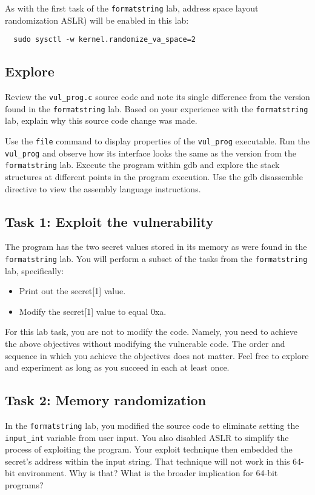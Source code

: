 As with the first task of the {\tt formatstring} lab, address space layout randomization ASLR) will be
enabled in this lab:
\begin{verbatim}
  sudo sysctl -w kernel.randomize_va_space=2
\end{verbatim}

\subsection{Explore}
Review the {\tt vul\_prog.c} source code and note its single difference from the version found in the
{\tt formatstring} lab.  Based on your experience with the {\tt formatstring} lab, explain why this
source code change was made.

Use the {\tt file} command to display properties of the {\tt vul\_prog} executable.
Run the {\tt vul\_prog} and observe how its interface looks the same as the version from the {\tt formatstring} lab.
Execute the program within gdb and explore the stack structures at different points in the program execution.  Use
the gdb disassemble directive to view the assembly language instructions.

\subsection{Task 1: Exploit the vulnerability}
The program has the two secret values stored in its memory as were found in the {\tt formatstring} lab.
You will perform a subset of the tasks from the {\tt formatstring} lab, specifically:

\begin{itemize} 
\item Print out the secret[1] value.
\item Modify the secret[1] value to equal 0xa.
\end{itemize} 

For this lab task, you are not to modify the code. Namely, you need to achieve
the above objectives without modifying the vulnerable code.  The order and sequence in which 
you achieve the objectives does not matter.  Feel free to explore and experiment as long as you
succeed in each at least once.

\subsection{Task 2: Memory randomization}
In the {\tt formatstring} lab, you modified the source code to eliminate setting the {\tt input\_int}
variable from user input.  You also disabled ASLR to simplify the process of exploiting the program.  
Your exploit technique then embedded the secret's address within the input string.  That technique
will not work in this 64-bit environment.  Why is that?  What is the broader implication for 64-bit
programs?

